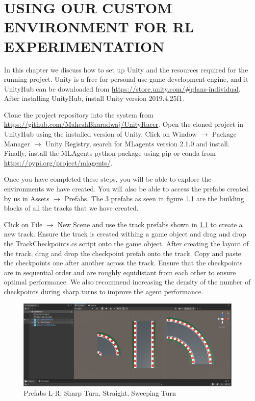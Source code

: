 \chapter{USING OUR CUSTOM ENVIRONMENT FOR RL EXPERIMENTATION}

In this chapter we discuss how to set up Unity and the resources required for the running project. Unity is a free for personal use game development engine, and it UnityHub can be downloaded from  \href{https://store.unity.com/\#plans-individual}{https://store.unity.com/\#plans-individual}. After installing UnityHub, install Unity version 2019.4.25f1.

Clone the project repository into the system from \href{https://github.com/MaheshBharadwaj/UnityRacer}{https://github.com/MaheshBharadwaj/UnityRacer}.
Open the cloned project in UnityHub using the installed version of Unity. Click on Window $\rightarrow$ Package Manager $\rightarrow$ Unity Registry, search for MLagents version 2.1.0 and install. Finally, install the MLAgents python package using pip or conda from \href{https://pypi.org/project/mlagents/}{https://pypi.org/project/mlagents/}.

Once you have completed these steps, you will be able to explore the environments we have created. You will also be able to access the prefabs created by us in Assets $\rightarrow$ Prefabs. The 3 prefabs as seen in figure \ref{fig:prefabs} are the building blocks of all the tracks that we have created. 

Click on File $\rightarrow$ New Scene and use the track prefabs shown in \ref{fig:prefabs} to create a new track. Ensure the track is created withing a game object and drag and drop the TrackCheckpoints.cs script onto the game object. After creating the layout of the track, drag and drop the checkpoint prefab onto the track. Copy and paste the checkpoints one after another across the track. Ensure that the checkpoints are in sequential order and are roughly equidistant from each other to ensure optimal performance. We also recommend increasing the density of the number of checkpoints during sharp turns to improve the agent performance.
 
\begin{figure}[H]
    \centering
    \includegraphics[width=1.0\textwidth]{images/Appendix_scene_prefabs.png}
    \caption{Prefabs L-R: Sharp Turn, Straight, Sweeping Turn}
    \label{fig:prefabs}
\end{figure}

